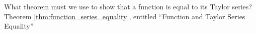 {What theorem must we use to show that a function is equal to its Taylor series?
}
{Theorem \ref{thm:function_series_equality}, entitled ``Function and Taylor Series Equality''
}